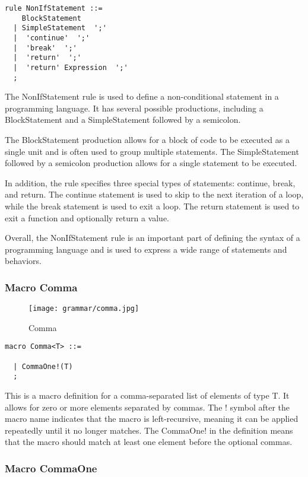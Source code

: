 \begin{lstlisting}
rule NonIfStatement ::=
    BlockStatement 
  | SimpleStatement  ';' 
  |  'continue'  ';' 
  |  'break'  ';' 
  |  'return'  ';' 
  |  'return' Expression  ';' 
  ;
\end{lstlisting}

The NonIfStatement rule is used to define a non-conditional statement in a programming language. It has several possible productions, including a BlockStatement and a SimpleStatement followed by a semicolon.

The BlockStatement production allows for a block of code to be executed as a single unit and is often used to group multiple statements. The SimpleStatement followed by a semicolon production allows for a single statement to be executed.

In addition, the rule specifies three special types of statements: continue, break, and return. The continue statement is used to skip to the next iteration of a loop, while the break statement is used to exit a loop. The return statement is used to exit a function and optionally return a value.

Overall, the NonIfStatement rule is an important part of defining the syntax of a programming language and is used to express a wide range of statements and behaviors.

\subsubsection*{Macro Comma}

\begin{figure}
  \centering
  \texttt{[image: grammar/comma.jpg]}
  \caption{Comma}
  \end{figure}

\begin{lstlisting}
macro Comma<T> ::=
    
  | CommaOne!(T) 
  ;
\end{lstlisting}

This is a macro definition for a comma-separated list of elements of type T. It allows for zero or more elements separated by commas. The ! symbol after the macro name indicates that the macro is left-recursive, meaning it can be applied repeatedly until it no longer matches. The CommaOne! in the definition means that the macro should match at least one element before the optional commas.

\subsubsection*{Macro CommaOne}

